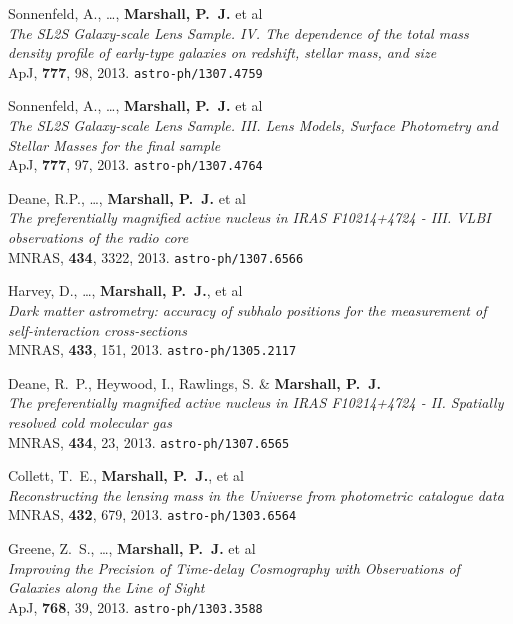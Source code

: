 \begin{revnumerate}
  \item{{Sonnenfeld}, A., \ldots, \textbf{{Marshall}, P.~J.} et al\\
  \textit{The SL2S Galaxy-scale Lens Sample. IV. The dependence of the total mass density profile of early-type galaxies on redshift, stellar mass, and size}\\
  ApJ, \textbf{777}, 98, 2013.
  \texttt{astro-ph/1307.4759}
  }

  \item{{Sonnenfeld}, A., \ldots, \textbf{{Marshall}, P.~J.} et al\\
  \textit{The SL2S Galaxy-scale Lens Sample. III. Lens Models, Surface Photometry and Stellar Masses for the final sample}\\
  ApJ, \textbf{777}, 97, 2013.
  \texttt{astro-ph/1307.4764}
  }

  \item{{Deane}, R.P., \ldots, \textbf{{Marshall}, P.~J.} et al\\
  \textit{The preferentially magnified active nucleus in IRAS F10214+4724 - III. VLBI observations of the radio core}\\
  MNRAS, \textbf{434}, 3322, 2013.
  \texttt{astro-ph/1307.6566}
  }

  \item{Harvey, D., \ldots, \textbf{Marshall, P.~J.}, et al\\
  \textit{Dark matter astrometry: accuracy of subhalo positions for the measurement of self-interaction cross-sections}\\
  MNRAS, \textbf{433}, 151, 2013.
  \texttt{astro-ph/1305.2117}
  }

  \item{Deane, R.~P., Heywood, I., Rawlings, S. \& \textbf{Marshall, P.~J.}\\
  \textit{The preferentially magnified active nucleus in IRAS F10214+4724 - II. Spatially resolved cold molecular gas}\\
  MNRAS, \textbf{434}, 23, 2013.
  \texttt{astro-ph/1307.6565}
  }


  \item{Collett, T.~E., \textbf{Marshall, P.~J.}, et al\\
  \textit{Reconstructing the lensing mass in the Universe from photometric catalogue data}\\
  MNRAS, \textbf{432}, 679, 2013.
  \texttt{astro-ph/1303.6564}
  }

  \item{Greene, Z.~S., \ldots, \textbf{Marshall, P.~J.} et al\\
  \textit{Improving the Precision of Time-delay Cosmography with Observations of Galaxies along the Line of Sight}\\
  ApJ, \textbf{768}, 39, 2013.
  \texttt{astro-ph/1303.3588}
  }


\end{revnumerate}
